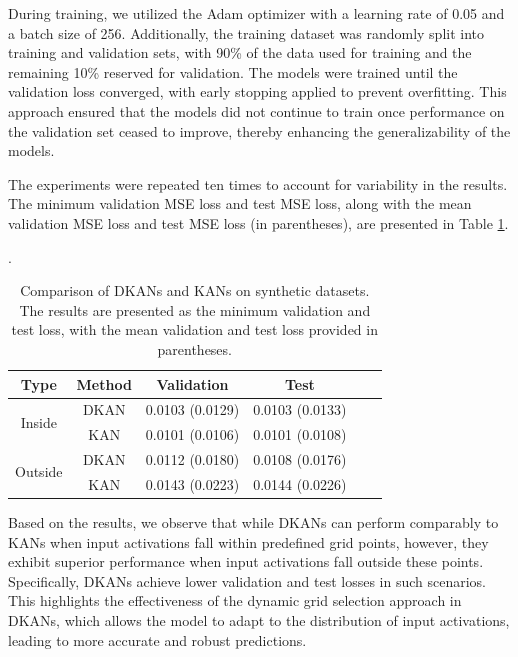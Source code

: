 \documentclass[11pt]{scrartcl}
\begin{document}
During training, we utilized the Adam optimizer with a learning rate of 0.05 and a batch size of 256. Additionally, the training dataset was randomly split into training and validation sets, with 90\% of the data used for training and the remaining 10\% reserved for validation.
The models were trained until the validation loss converged, with early stopping applied to prevent overfitting. This approach ensured that the models did not continue to train once performance on the validation set ceased to improve, thereby enhancing the generalizability of the models.

The experiments were repeated ten times to account for variability in the results. The minimum validation MSE loss and test MSE loss, along with the mean validation MSE loss and test MSE loss (in parentheses), are presented in Table \ref{tab:synthetic-dataset}.

\begin{table}[htbp]
	\centering
	\caption{Comparison of DKANs and KANs on synthetic datasets. The results are presented as the minimum validation and test loss, with the mean validation and test loss provided in parentheses.}
	\label{tab:synthetic-dataset}.
	\begin{tabular}{cccccc}
		\toprule
		Type                     & Method & Validation      & Test            \\
		\midrule
		\multirow{2}{*}{Inside}  & DKAN   & 0.0103 (0.0129) & 0.0103 (0.0133) \\
		                         & KAN    & 0.0101 (0.0106) & 0.0101 (0.0108) \\
		\midrule
		\multirow{2}{*}{Outside} & DKAN   & 0.0112 (0.0180) & 0.0108 (0.0176) \\
		                         & KAN    & 0.0143 (0.0223) & 0.0144 (0.0226) \\
		\bottomrule
	\end{tabular}
\end{table}

Based on the results, we observe that while DKANs can perform comparably to KANs when input activations fall within predefined grid points, however, they exhibit superior performance when input activations fall outside these points. Specifically, DKANs achieve lower validation and test losses in such scenarios. This highlights the effectiveness of the dynamic grid selection approach in DKANs, which allows the model to adapt to the distribution of input activations, leading to more accurate and robust predictions.
\end{document}
